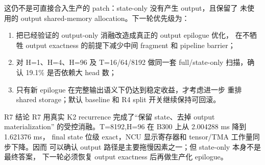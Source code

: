 这仍不是可直接合入生产的 patch：state-only 没有产生 output，且保留了
未使用的 output shared-memory allocation。下一轮优先级为：

\begin{enumerate}
  \item 把已经验证的 output-only 消融改造成真正的 output epilogue 优化，
        在不牺牲 output exactness 的前提下减少中间 fragment 和 pipeline
        barrier；
  \item 对 H=1、H=4、H=96 及 T=16/64/8192 做同一套 full/state-only
        扫描，确认 19.1\% 是否依赖大 head 数；
  \item 只有新 epilogue 在完整输出语义下仍达到稳定收益，才考虑进一步
        重排 shared storage；默认 baseline 和 R4 split 开关继续保持可回滚。
\end{enumerate}

\begin{record}{R7 结论}
R7 用真实 K2 recurrence 完成了“保留 state、去掉 output materialization”
的受控消融。T=8192,H=96 在 B300 上从 2.004288 ms 降到 1.621376 ms，
final state 位级 exact，NCU 显示寄存器和 tensor/TMA 工作量同步下降。因而
可以确认 output 路径是主要拖慢因素之一；但 state-only 本身不是最终答案，
下一轮必须恢复 output exactness 后再做生产化 epilogue。\end{record}
